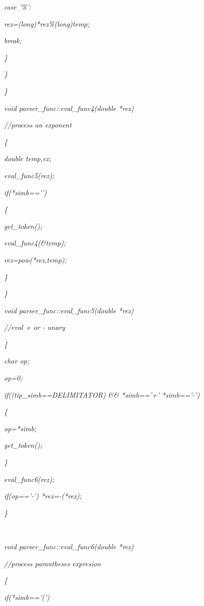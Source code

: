 \documentclass[a4paper,twoside]{book}
\begin{document}
\textit{\qquad \qquad case '\%':}

\textit{\qquad \qquad \qquad *rez=(long)*rez\%(long)temp;}

\textit{\qquad \qquad \qquad break;}

\textit{\qquad \qquad \}}

\textit{\qquad \}}

\textit{\}}

\textit{void parser\_func::eval\_func4(double *rez)}

\textit{//process an exponent}

\textit{\{}

\textit{\qquad double temp,ex;}

\textit{\qquad eval\_func5(rez);}

\textit{\qquad if(*simb=='')}

\textit{\qquad \{}

\textit{\qquad \qquad get\_token();}

\textit{\qquad \qquad eval\_func4(\&temp);}

\textit{\qquad \qquad *rez=pow(*rez,temp);}

\textit{\qquad \}}

\textit{\}}

\textit{void parser\_func::eval\_func5(double *rez)}

\textit{//eval + or - unary}

\textit{\{}

\textit{\qquad char op;}

\textit{\qquad op=0;}

\textit{\qquad if((tip\_simb==DELIMITATOR) \&\& *simb=='+' \TEXTsymbol{\vert}%
\TEXTsymbol{\vert} *simb=='-')}

\textit{\qquad \{}

\textit{\qquad \qquad op=*simb;}

\textit{\qquad \qquad get\_token();}

\textit{\qquad \}}

\textit{\qquad eval\_func6(rez);}

\textit{\qquad if(op=='-') *rez=-(*rez);}

\textit{\}}

\textit{\ }

\textit{void parser\_func::eval\_func6(double *rez)}

\textit{//process parantheses expresion}

\textit{\{}

\textit{\qquad if(*simb=='(')}
\end{document}
